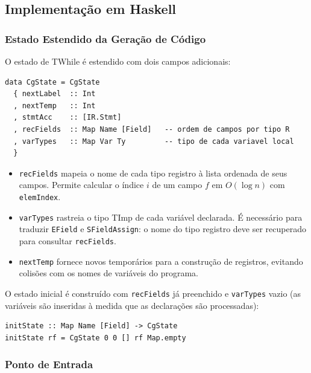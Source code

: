 \subsection{Implementação em Haskell}
\label{sec:ir-timp-impl}

\subsubsection*{Estado Estendido da Geração de Código}

O estado de TWhile é estendido com dois campos adicionais:

\begin{verbatim}
data CgState = CgState
  { nextLabel  :: Int
  , nextTemp   :: Int
  , stmtAcc    :: [IR.Stmt]
  , recFields  :: Map Name [Field]   -- ordem de campos por tipo R
  , varTypes   :: Map Var Ty         -- tipo de cada variavel local
  }
\end{verbatim}

\begin{itemize}
  \item \texttt{recFields} mapeia o nome de cada tipo registro à lista
    ordenada de seus campos. Permite calcular o índice \(i\) de um campo
    \(f\) em \(O(\log n)\) com \texttt{elemIndex}.
  \item \texttt{varTypes} rastreia o tipo TImp de cada variável declarada.
    É necessário para traduzir \texttt{EField} e \texttt{SFieldAssign}: o
    nome do tipo registro deve ser recuperado para consultar
    \texttt{recFields}.
  \item \texttt{nextTemp} fornece novos temporários para a construção de
    registros, evitando colisões com os nomes de variáveis do programa.
\end{itemize}

O estado inicial é construído com \texttt{recFields} já preenchido e
\texttt{varTypes} vazio (as variáveis são inseridas à medida que as
declarações são processadas):

\begin{verbatim}
initState :: Map Name [Field] -> CgState
initState rf = CgState 0 0 [] rf Map.empty
\end{verbatim}

\subsubsection*{Ponto de Entrada}

